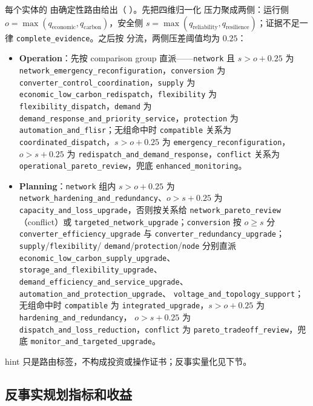 每个实体的  由确定性路由给出（
）。先把四维归一化
压力聚成两侧：运行侧 $o=\max(q_{\mathrm{economic}},q_{\mathrm{carbon}})$，安全侧
$s=\max(q_{\mathrm{reliability}},q_{\mathrm{resilience}})$；证据不足一律
\texttt{complete\_evidence}。之后按  分流，两侧压差阈值均为
$0.25$：
\begin{itemize}
  \item \textbf{Operation}：先按 comparison group 直派——\texttt{network} 且
        $s>o+0.25$ 为 \texttt{network\_emergency\_reconfiguration}，\texttt{conversion}
        为 \texttt{converter\_control\_coordination}，\texttt{supply} 为
        \texttt{economic\_low\_carbon\_redispatch}，\texttt{flexibility} 为
        \texttt{flexibility\_dispatch}，\texttt{demand} 为
        \texttt{demand\_response\_and\_priority\_service}，\texttt{protection} 为
        \texttt{automation\_and\_flisr}；无组命中时 \texttt{compatible} 关系为
        \texttt{coordinated\_dispatch}，$s>o+0.25$ 为 \texttt{emergency\_reconfiguration}，
        $o>s+0.25$ 为 \texttt{redispatch\_and\_demand\_response}，\texttt{conflict} 关系为
        \texttt{operational\_pareto\_review}，兜底 \texttt{enhanced\_monitoring}。
  \item \textbf{Planning}：\texttt{network} 组内 $s>o+0.25$ 为
        \texttt{network\_hardening\_and\_redundancy}、$o>s+0.25$ 为
        \texttt{capacity\_and\_loss\_upgrade}，否则按关系给 \texttt{network\_pareto\_review}
        （conflict）或 \texttt{targeted\_network\_upgrade}；\texttt{conversion} 按
        $o\ge s$ 分 \texttt{converter\_efficiency\_upgrade} 与
        \texttt{converter\_redundancy\_upgrade}；\texttt{supply}/\texttt{flexibility}/
        \texttt{demand}/\texttt{protection}/\texttt{node} 分别直派
        \texttt{economic\_low\_carbon\_supply\_upgrade}、\texttt{storage\_and\_flexibility\_upgrade}、
        \texttt{demand\_efficiency\_and\_service\_upgrade}、\texttt{automation\_and\_protection\_upgrade}、
        \texttt{voltage\_and\_topology\_support}；无组命中时 \texttt{compatible} 为
        \texttt{integrated\_upgrade}，$s>o+0.25$ 为 \texttt{hardening\_and\_redundancy}，
        $o>s+0.25$ 为 \texttt{dispatch\_and\_loss\_reduction}，\texttt{conflict} 为
        \texttt{pareto\_tradeoff\_review}，兜底 \texttt{monitor\_and\_targeted\_upgrade}。
\end{itemize}
hint 只是路由标签，不构成投资或操作证书；反事实量化见下节。

\subsection{反事实规划指标和收益}

